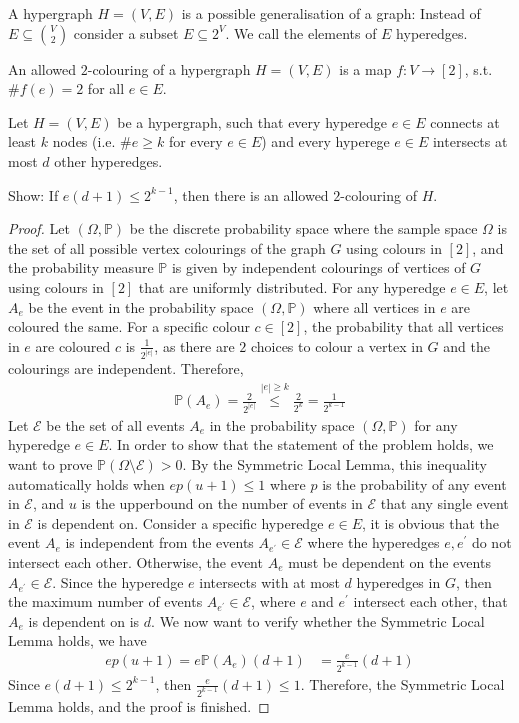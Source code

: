 \begin{problem}
  A hypergraph $H=(V,E)$ is a possible generalisation of a graph: Instead of $E \subseteq \binom{V}{2}$ consider a subset $E \subseteq 2^{V}$. We call the elements of $E$ hyperedges.

  An allowed $2$-colouring of a hypergraph $H=(V,E)$ is a map $f : V \to [2]$, s.t. $\#f(e)=2$ for all $e \in E$.

  Let $H=(V,E)$ be a hypergraph, such that every hyperedge $e \in E$ connects at least $k$ nodes (i.e. $\# e \geq k$ for every $e \in E$) and every hyperege $e \in E$ intersects at most $d$ other hyperedges.

  Show: If $e(d+1) \leq 2^{k-1}$, then there is an allowed $2$-colouring of $H$.
\end{problem}
\begin{proof}
  Let $(\Omega, \mathbb{P})$ be the discrete probability space where the sample space $\Omega$ is the set of all possible vertex colourings of the graph $G$ using colours in $[2]$, and the probability measure $\mathbb{P}$ is given by independent colourings of vertices of $G$ using colours in $[2]$ that are uniformly distributed. For any hyperedge $e\in E$, let $A_{e}$ be the event in the probability space $(\Omega, \mathbb{P})$ where all vertices in $e$ are coloured the same. For a specific colour $c \in [2]$, the probability that all vertices in $e$ are coloured $c$ is $\frac{1}{2^{|e|}}$, as there are $2$ choices to colour a vertex in $G$ and the colourings are independent. Therefore,
\begin{align*}
  \mathbb{P}(A_{e}) = \frac{2}{2^{|e|}} \overset{|e| \geq k}{\leq} \frac{2}{2^{k}} = \frac{1}{2^{k-1}}
\end{align*}
Let $\mathcal{E}$ be the set of all events $A_{e}$ in the probability space $(\Omega, \mathbb{P})$ for any hyperedge $e \in E$. In order to show that the statement of the problem holds, we want to prove $\mathbb{P}(\Omega \setminus \mathcal{E}) > 0$. By the Symmetric Local Lemma, this inequality automatically holds when $ep(u+1) \leq 1$ where $p$ is the probability of any event in $\mathcal{E}$, and $u$ is the upperbound on the number of events in $\mathcal{E}$ that any single event in $\mathcal{E}$ is dependent on. Consider a specific hyperedge $e \in E$, it is obvious that the event $A_{e}$ is independent from the events $A_{e^{'}} \in \mathcal{E}$ where the hyperedges $e,e^{'}$ do not intersect each other. Otherwise, the event $A_{e}$ must be dependent on the events $A_{e^{'}} \in \mathcal{E}$. Since the hyperedge $e$ intersects with at most $d$ hyperedges in $G$, then the maximum number of events $A_{e^{'}} \in \mathcal{E}$, where $e$ and $e^{'}$ intersect each other, that $A_{e}$ is dependent on is $d$. We now want to verify whether the Symmetric Local Lemma holds, we have
\begin{align*}
  ep(u+1) = e\mathbb{P}(A_{e})(d+1) &= \frac{e}{2^{k-1}}(d+1)
\end{align*}
Since $e(d+1) \leq 2^{k-1}$, then $\frac{e}{2^{k-1}}(d+1) \leq 1$. Therefore, the Symmetric Local Lemma holds, and the proof is finished.
\end{proof}

